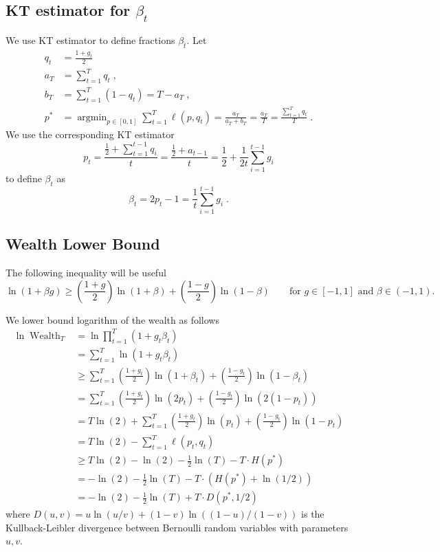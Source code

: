 \documentclass{article}
\DeclareMathOperator*{\argmin}{argmin}
\DeclareMathOperator{\Wealth}{Wealth}
\begin{document}
\subsection{KT estimator for $\beta_t$}

We use KT estimator to define fractions $\beta_t$. Let
\begin{align*}
q_t & = \frac{1 + g_t}{2} \\
a_T & = \sum_{t=1}^T q_t \; , \\
b_T & = \sum_{t=1}^T (1 - q_t) = T - a_T \; , \\
p^* & =  \argmin_{p \in [0,1]} \sum_{t=1}^T \ell(p, q_t) = \frac{a_T}{a_T + b_T} = \frac{a_T}{T} = \frac{\sum_{t=1}^T q_t}{T} \; .
\end{align*}
We use the corresponding KT estimator
$$
p_t = \frac{\frac{1}{2} + \sum_{t=1}^{t-1} q_i}{t} = \frac{\frac{1}{2} + a_{t-1}}{t} = \frac{1}{2} + \frac{1}{2t} \sum_{i=1}^{t-1} g_i
$$
to define $\beta_t$ as
$$
\beta_t = 2p_t - 1 = \frac{1}{t} \sum_{i=1}^{t-1} g_i \; .
$$

\subsection{Wealth Lower Bound}

The following inequality will be useful
$$
\ln\left(1 + \beta g \right) \ge \left( \frac{1+g}{2} \right) \ln \left(1 + \beta\right) + \left( \frac{1-g}{2} \right) \ln \left(1 - \beta \right)
\qquad \text{for $g \in [-1,1]$ and $\beta \in (-1,1)$}.
$$

We lower bound logarithm of the wealth as follows
\allowdisplaybreaks
\begin{align*}
\ln \Wealth_T
& = \ln \prod_{t=1}^T (1 + g_t\beta_t) \\
& =  \sum_{t=1}^T \ln (1 + g_t\beta_t) \\
& \ge  \sum_{t=1}^T \left( \frac{1+g_t}{2} \right) \ln \left(1 + \beta_t\right) + \left( \frac{1-g_t}{2} \right) \ln \left(1 - \beta_t \right) \\
& =  \sum_{t=1}^T \left( \frac{1+g_t}{2} \right) \ln \left(2p_t \right) + \left( \frac{1-g_t}{2} \right) \ln \left(2 (1 - p_t) \right) \\
& =  T \ln(2) + \sum_{t=1}^T \left( \frac{1+g_t}{2} \right) \ln (p_t) + \left( \frac{1-g_t}{2} \right) \ln (1 - p_t) \\
& =  T \ln(2) - \sum_{t=1}^T \ell(p_t, q_t) \\
& \ge  T \ln(2) - \ln(2) - \frac{1}{2} \ln(T) - T \cdot H(p^*) \\
& =  - \ln(2) - \frac{1}{2} \ln(T) - T \cdot (H(p^*) + \ln(1/2)) \\
& =  - \ln(2) - \frac{1}{2} \ln(T) + T \cdot D\left(p^*, 1/2 \right)
\end{align*}
where $D(u,v) = u \ln(u/v) + (1-v) \ln((1-u)/(1-v))$ is the Kullback-Leibler divergence
between Bernoulli random variables with parameters $u,v$.
\end{document}
